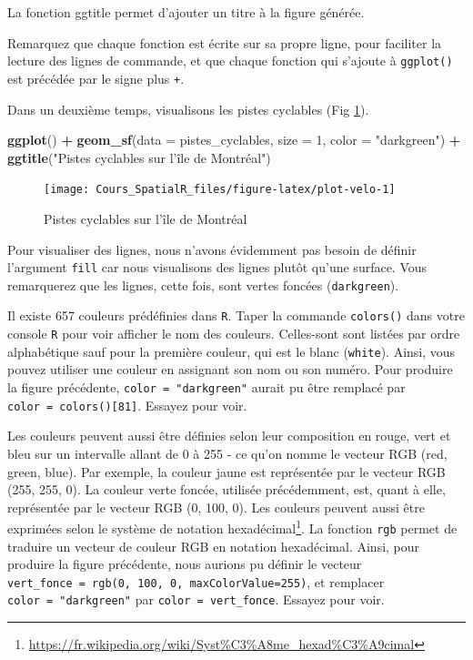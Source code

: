 \documentclass[
  12pt,
]{krantz}
\newenvironment{Shaded}{\begin{snugshade}}{\end{snugshade}}
\newcommand{\DataTypeTok}[1]{\textcolor[rgb]{0.13,0.29,0.53}{#1}}
\newcommand{\DecValTok}[1]{\textcolor[rgb]{0.00,0.00,0.81}{#1}}
\newcommand{\KeywordTok}[1]{\textcolor[rgb]{0.13,0.29,0.53}{\textbf{#1}}}
\newcommand{\NormalTok}[1]{#1}
\newcommand{\OperatorTok}[1]{\textcolor[rgb]{0.81,0.36,0.00}{\textbf{#1}}}
\newcommand{\StringTok}[1]{\textcolor[rgb]{0.31,0.60,0.02}{#1}}
\renewcommand{\href}[2]{#2\footnote{\url{#1}}}
\begin{document}
La fonction ggtitle permet d'ajouter un titre à la figure générée.

Remarquez que chaque fonction est écrite sur sa propre ligne, pour faciliter la lecture des lignes de commande, et que chaque fonction qui s'ajoute à \texttt{ggplot()} est précédée par le signe plus \texttt{+}.

Dans un deuxième temps, visualisons les pistes cyclables (Fig \ref{fig:plot-velo}).

\begin{Shaded}
\begin{Highlighting}[]
\KeywordTok{ggplot}\NormalTok{() }\OperatorTok{+}
\KeywordTok{geom_sf}\NormalTok{(}\DataTypeTok{data =}\NormalTok{ pistes_cyclables, }\DataTypeTok{size =} \DecValTok{1}\NormalTok{, }\DataTypeTok{color =} \StringTok{"darkgreen"}\NormalTok{) }\OperatorTok{+}
\KeywordTok{ggtitle}\NormalTok{(}\StringTok{"Pistes cyclables sur l'île de Montréal"}\NormalTok{)}
\end{Highlighting}
\end{Shaded}

\begin{figure}

{\centering \texttt{[image: Cours\_SpatialR\_files/figure-latex/plot-velo-1]} 

}

\caption{Pistes cyclables sur l'île de Montréal}\label{fig:plot-velo}
\end{figure}

Pour visualiser des lignes, nous n'avons évidemment pas besoin de définir l'argument \texttt{fill} car nous visualisons des lignes plutôt qu'une surface. Vous remarquerez que les lignes, cette fois, sont vertes foncées (\texttt{darkgreen}).

Il existe 657 couleurs prédéfinies dans \texttt{R}. Taper la commande \texttt{colors()} dans votre console \texttt{R} pour voir afficher le nom des couleurs. Celles-sont sont listées par ordre alphabétique sauf pour la première couleur, qui est le blanc (\texttt{white}). Ainsi, vous pouvez utiliser une couleur en assignant son nom ou son numéro. Pour produire la figure précédente, \texttt{color\ =\ "darkgreen"} aurait pu être remplacé par
\texttt{color\ =\ colors(){[}81{]}}. Essayez pour voir.

Les couleurs peuvent aussi être définies selon leur composition en rouge, vert et bleu sur un intervalle allant de 0 à 255 - ce qu'on nomme le vecteur RGB (red, green, blue). Par exemple, la couleur jaune est représentée par le vecteur RGB (255, 255, 0). La couleur verte foncée, utilisée précédemment, est, quant à elle, représentée par le vecteur RGB (0, 100, 0). Les couleurs peuvent aussi être exprimées selon le système de notation \href{https://fr.wikipedia.org/wiki/Syst\%C3\%A8me_hexad\%C3\%A9cimal}{hexadécimal}. La fonction \texttt{rgb} permet de traduire un vecteur de couleur RGB en notation hexadécimal. Ainsi, pour produire la figure précédente, nous aurions pu définir le vecteur \texttt{vert\_fonce\ =\ rgb(0,\ 100,\ 0,\ maxColorValue=255)}, et remplacer \texttt{color\ =\ "darkgreen"} par \texttt{color\ =\ vert\_fonce}. Essayez pour voir.
\end{document}
